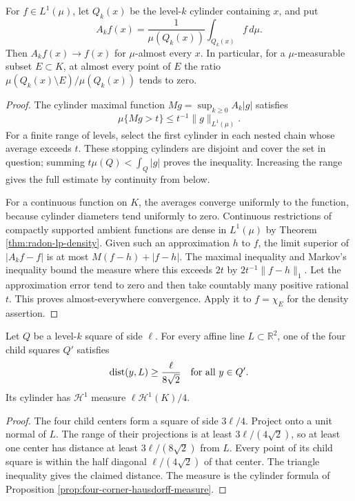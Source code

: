 \begin{lemma}\label{lem:four-corner-cylinder-differentiation}
For $f\in L^1(\mu)$, let $Q_k(x)$ be the level-$k$ cylinder containing $x$, and put
\[
 A_kf(x)=\frac1{\mu(Q_k(x))}\int_{Q_k(x)}f\,d\mu.
\]
Then $A_kf(x)\to f(x)$ for $\mu$-almost every $x$. In particular, for a $\mu$-measurable subset $E\subset K$, at almost every point of $E$ the ratio $\mu(Q_k(x)\setminus E)/\mu(Q_k(x))$ tends to zero.
\end{lemma}
\begin{proof}
The cylinder maximal function $Mg=\sup_{k\ge0}A_k|g|$ satisfies
\[
 \mu\{Mg>t\}\le t^{-1}\|g\|_{L^1(\mu)}.
\]
For a finite range of levels, select the first cylinder in each nested chain whose average exceeds $t$. These stopping cylinders are disjoint and cover the set in question; summing $t\mu(Q)<\int_Q|g|$ proves the inequality. Increasing the range gives the full estimate by continuity from below.

For a continuous function on $K$, the averages converge uniformly to the function, because cylinder diameters tend uniformly to zero. Continuous restrictions of compactly supported ambient functions are dense in $L^1(\mu)$ by Theorem \ref{thm:radon-lp-density}. Given such an approximation $h$ to $f$, the limit superior of $|A_kf-f|$ is at most $M(f-h)+|f-h|$. The maximal inequality and Markov's inequality bound the measure where this exceeds $2t$ by $2t^{-1}\|f-h\|_1$. Let the approximation error tend to zero and then take countably many positive rational $t$. This proves almost-everywhere convergence. Apply it to $f=\chi_E$ for the density assertion.
\end{proof}

\begin{lemma}\label{lem:four-corner-line-obstruction}
Let $Q$ be a level-$k$ square of side $\ell$. For every affine line $L\subset\mathbb R^2$, one of the four child squares $Q'$ satisfies
\[
 \operatorname{dist}(y,L)\ge\frac{\ell}{8\sqrt2}\quad\hbox{for all }y\in Q'.
\]
Its cylinder has $\mathcal H^1$ measure $\ell\mathcal H^1(K)/4$.
\end{lemma}
\begin{proof}
The four child centers form a square of side $3\ell/4$. Project onto a unit normal of $L$. The range of their projections is at least $3\ell/(4\sqrt2)$, so at least one center has distance at least $3\ell/(8\sqrt2)$ from $L$. Every point of its child square is within the half diagonal $\ell/(4\sqrt2)$ of that center. The triangle inequality gives the claimed distance. The measure is the cylinder formula of Proposition \ref{prop:four-corner-hausdorff-measure}.
\end{proof}

